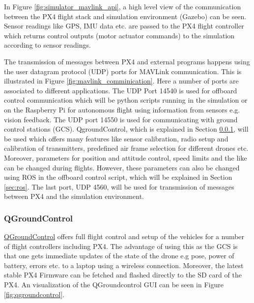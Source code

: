 \documentclass[../Head/report.tex]{subfiles}
\begin{document}
In Figure \ref{fig:simulator_mavlink_api}, a high level view of the communication between the PX4 flight stack and simulation environment (Gazebo) can be seen. Sensor readings like GPS, IMU data etc. are passed to the PX4 flight controller which returns control outputs (motor actuator commands) to the simulation according to sensor readings. 

The transmission of messages between PX4 and external programs happens using  the user datagram protocol (UDP) ports for MAVLink communication. This is illustrated in Figure \ref{fig:mavlink_comminication}. Here a number of ports are associated to different applications. The UDP Port 14540 is used for offboard control communication which will be python scripts running in the simulation or on the Raspberry Pi for autonomous flight using information from sensors e.g. vision feedback. The UDP port 14550 is used for communicating with ground control stations (GCS). QgroundControl, which is explained in Section \ref{sec:qgroundcontrol},  will be used which offers many features like sensor calibration, radio setup and calibration of transmitters, predefined air frame selection for different drones etc. Moreover, parameters for position and attitude control, speed limits and the like can be changed during flights. However, these parameters can also be changed using ROS in the offboard control script, which will be explained in Section \ref{sec:ros}. The last port, UDP 4560, will be used for transmission of messages between PX4 and the simulation environment.


\subsubsection{QGroundControl}
\label{sec:qgroundcontrol}

\href{https://docs.qgroundcontrol.com/master/en/}{QGroundControl} offers full flight control and setup of the vehicles for a number of flight controllers including PX4. The advantage of using this as the GCS is that one gets immediate updates of the state of the drone e.g pose, power of battery, errors etc. to a laptop using a wireless connection.  Moreover, the latest stable PX4 Firmware can be fetched and flashed directly to the SD card of the PX4. An visualization of the QGroundcontrol GUI can be seen in Figure \ref{fig:qgroundcontrol}.
\end{document}
